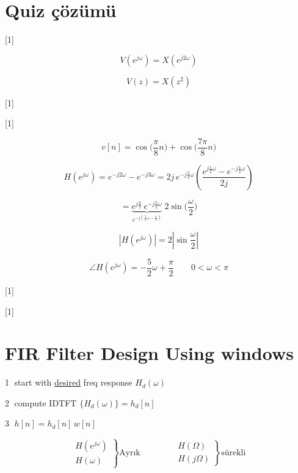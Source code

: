 \documentclass[11pt,a4paper]{article}
\begin{document}

\section{Quiz çözümü}

[1]

\[ V(e^{j\omega}) = X(e^{j2\omega}) \]

\[ V(z) = X(z^2) \]

[1]

[1]

\[ v[n] = \cos\Big(\frac{\pi}{8}n\Big) + \cos\Big(\frac{7\pi}{8}n\Big) \]

\[ H(e^{j\omega}) = e^{-j2\omega} - e^{-j3\omega} = 2j\, e^{-j\frac{5}{2}\omega} \left( \frac{e^{j\frac{1}{2}\omega} - e^{-j\frac{1}{2}\omega}}{2j} \right) \]

\[ {}= \underbrace{e^{j\frac{\pi}{2}}\, e^{-j\frac{5}{2}\omega}}_{e^{-j\left(\frac{5}{2}\omega - \frac{\pi}{2}\right)}}\; 2\sin\Big(\frac{\omega}{2}\Big) \]

\[ |H(e^{j\omega})| = 2\left|\sin\frac{\omega}{2}\right| \]

\[ \angle H(e^{j\omega}) = -\frac{5}{2}\omega + \frac{\pi}{2} \qquad 0 < \omega < \pi \]

[1]

[1]

\section{FIR Filter Design Using windows}

\textcircled{1} start with \underline{desired} freq response $H_d(\omega)$

\textcircled{2} compute IDTFT $\{H_d(\omega)\} = h_d[n]$

\textcircled{3} $h[n] = h_d[n]\,w[n]$

\[ \left.\begin{array}{l} H(e^{j\omega}) \\ H(\omega) \end{array}\right\} \text{Ayrık} \qquad\qquad \left.\begin{array}{l} H(\Omega) \\ H(j\Omega) \end{array}\right\} \text{sürekli} \]
\end{document}
